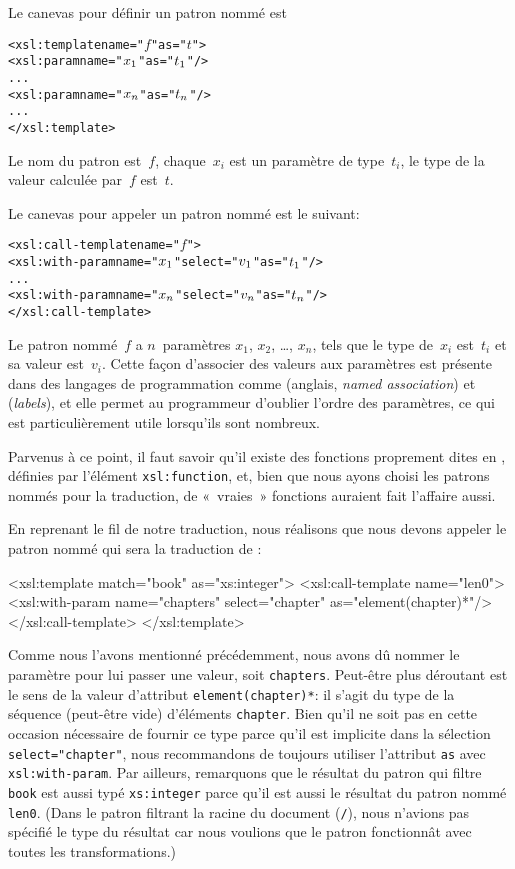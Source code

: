 Le canevas pour définir un patron nommé est
\begin{alltt}
\small<xsl:template name="\(f\)" as="\(t\)">
  <xsl:param name="\(x\sb{1}\)" as="\(t\sb{1}\)"/>
  ...
  <xsl:param name="\(x\sb{n}\)" as="\(t\sb{n}\)"/>
  ...
</xsl:template>
\end{alltt}
Le nom du patron est~\(f\), chaque~\(x_i\) est un paramètre de
type~\(t_i\), le type de la valeur calculée par~\(f\) est~\(t\).

Le canevas pour appeler un patron nommé est le suivant:
\begin{alltt}
\small<xsl:call-template name="\(f\)">
  <xsl:with-param name="\(x\sb{1}\)" select="\(v\sb{1}\)" as="\(t\sb{1}\)"/>
  ...
  <xsl:with-param name="\(x\sb{n}\)" select="\(v\sb{n}\)" as="\(t\sb{n}\)"/>
</xsl:call-template>
\end{alltt}
Le patron nommé~\(f\) a \(n\)~paramètres \(x_1\), \(x_2\), \ldots,
\(x_n\), tels que le type de~\(x_i\) est~\(t_i\) et sa valeur
est~\(v_i\). Cette façon d'associer des valeurs aux paramètres est
présente dans des langages de programmation comme \Ada (anglais,
\emph{named association}) et \OCaml (\emph{labels}), et elle permet au
programmeur d'oublier l'ordre des paramètres, ce qui est
particulièrement utile lorsqu'ils sont nombreux.

Parvenus à ce point, il faut savoir qu'il existe des fonctions
proprement dites en \XSLT, définies par l'élément
\texttt{xsl:function}, et, bien que nous ayons choisi les patrons
nommés pour la traduction, de «~vraies~» fonctions \XSLT auraient fait
l'affaire aussi.

En reprenant le fil de notre traduction, nous réalisons que nous
devons appeler le patron nommé qui sera la traduction de :
\begin{sverb}
  <xsl:template match="book" as="xs:integer">
    <xsl:call-template name="len0">
      <xsl:with-param name="chapters" select="chapter"
                      as="element(chapter)*"/>
    </xsl:call-template>
  </xsl:template>
\end{sverb}
Comme nous l'avons mentionné précédemment, nous avons dû nommer le
paramètre pour lui passer une valeur, soit
\texttt{chapters}. Peut-être plus déroutant est le sens de la valeur
d'attribut \texttt{element(chapter)*}: il s'agit du type de la
séquence (peut-être vide) d'éléments \texttt{chapter}. Bien qu'il ne
soit pas en cette occasion nécessaire de fournir ce type parce qu'il
est implicite dans la sélection \texttt{select="chapter"}, nous
recommandons de toujours utiliser l'attribut \texttt{as} avec
\texttt{xsl:with-param}. Par ailleurs, remarquons que le résultat du
patron qui filtre \texttt{book} est aussi typé \texttt{xs:integer}
parce qu'il est aussi le résultat du patron nommé \texttt{len0}. (Dans
le patron filtrant la racine du document (\texttt{/}), nous n'avions
pas spécifié le type du résultat car nous voulions que le patron
fonctionnât avec toutes les transformations.)


